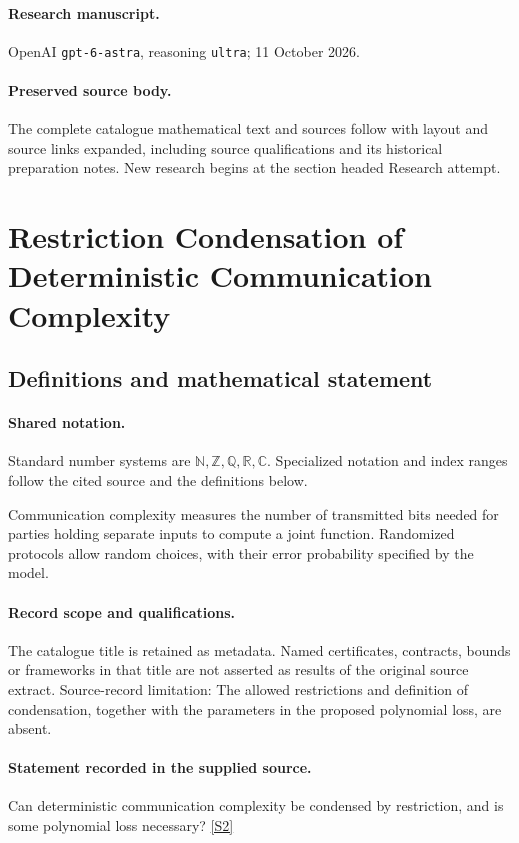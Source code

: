 \documentclass[11pt]{article}
\begin{document}
\paragraph{Research manuscript.} OpenAI \texttt{gpt-6-astra}, reasoning \texttt{ultra}; 11 October 2026.
\paragraph{Preserved source body.} The complete catalogue mathematical text and sources follow with layout and source links expanded, including source qualifications and its historical preparation notes. New research begins at the section headed Research attempt.

\section{Restriction Condensation of Deterministic Communication Complexity}\label{statement}

\subsection{Definitions and mathematical statement}

\paragraph{Shared notation.}Standard number systems are $\mathbb N,\mathbb Z,\mathbb Q,\mathbb R,\mathbb C$. Specialized notation and index ranges follow the cited source and the definitions below.


Communication complexity measures the number of transmitted bits needed for parties holding separate inputs to compute a joint function. Randomized protocols allow random choices, with their error probability specified by the model.
\paragraph{Record scope and qualifications.}
The catalogue title is retained as metadata. Named certificates, contracts, bounds or frameworks in that title are not asserted as results of the original source extract.
Source-record limitation: The allowed restrictions and definition of condensation, together with the parameters in the proposed polynomial loss, are absent.
\paragraph{Statement recorded in the supplied source.}
Can deterministic communication complexity be condensed by restriction, and is some polynomial loss necessary? \href{https://doi.org/10.4171/owr/2024/15}{[S2]}
\end{document}
